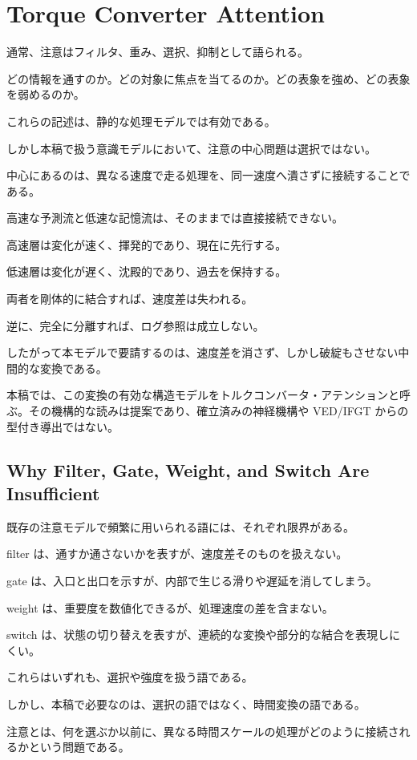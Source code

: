 \section{Torque Converter Attention}


通常、注意はフィルタ、重み、選択、抑制として語られる。

どの情報を通すのか。どの対象に焦点を当てるのか。どの表象を強め、どの表象を弱めるのか。

これらの記述は、静的な処理モデルでは有効である。

しかし本稿で扱う意識モデルにおいて、注意の中心問題は選択ではない。

中心にあるのは、異なる速度で走る処理を、同一速度へ潰さずに接続することである。

高速な予測流と低速な記憶流は、そのままでは直接接続できない。

高速層は変化が速く、揮発的であり、現在に先行する。

低速層は変化が遅く、沈殿的であり、過去を保持する。

両者を剛体的に結合すれば、速度差は失われる。

逆に、完全に分離すれば、ログ参照は成立しない。

したがって本モデルで要請するのは、速度差を消さず、しかし破綻もさせない中間的な変換である。

本稿では、この変換の有効な構造モデルをトルクコンバータ・アテンションと呼ぶ。その機構的な読みは提案であり、確立済みの神経機構や VED/IFGT からの型付き導出ではない。

\subsection{Why Filter, Gate, Weight, and Switch Are Insufficient}

既存の注意モデルで頻繁に用いられる語には、それぞれ限界がある。

filter は、通すか通さないかを表すが、速度差そのものを扱えない。

gate は、入口と出口を示すが、内部で生じる滑りや遅延を消してしまう。

weight は、重要度を数値化できるが、処理速度の差を含まない。

switch は、状態の切り替えを表すが、連続的な変換や部分的な結合を表現しにくい。

これらはいずれも、選択や強度を扱う語である。

しかし、本稿で必要なのは、選択の語ではなく、時間変換の語である。

注意とは、何を選ぶか以前に、異なる時間スケールの処理がどのように接続されるかという問題である。

